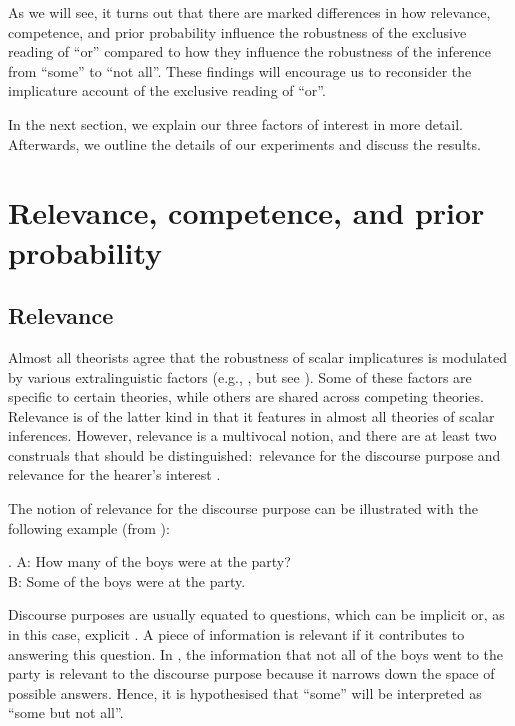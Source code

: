 \documentclass[12pt]{article}
\begin{document}
As we will see, it turns out that there are marked differences in how relevance, competence, and prior probability influence the robustness of the exclusive reading of ``or'' compared to how they influence the robustness of the inference from ``some'' to ``not all''. These findings will encourage us to reconsider the implicature account of the exclusive reading of ``or''.

In the next section, we explain our three factors of interest in more detail. Afterwards, we outline the details of our experiments and discuss the results.

\section{Relevance, competence, and prior probability}
\subsection*{Relevance}

Almost all theorists agree that the robustness of scalar implicatures is modulated by various extralinguistic factors (e.g., \citealt{chierchia2012, franke2009, geurts2010, horn1972}, but see \citealt{chierchia2004, levinson2000, storto2005}). Some of these factors are specific to certain theories, while others are shared across competing theories. Relevance is of the latter kind in that it features in almost all theories of scalar inferences. However, relevance is a multivocal notion, and there are at least two construals that should be distinguished:\ relevance for the discourse purpose and relevance for the hearer's interest \citep{geurts2010}.

The notion of relevance for the discourse purpose can be illustrated with the following example (from \citealt{kuppevelt1996}):

\ex.	A: How many of the boys were at the party? \\ B: Some of the boys were at the party.

Discourse purposes are usually equated to questions, which can be implicit or, as in this case, explicit \citep{roberts2012}. A piece of information is relevant if it contributes to answering this question. In \Last, the information that not all of the boys went to the party is relevant to the discourse purpose because it narrows down the space of possible answers. Hence, it is hypothesised that ``some'' will be interpreted as ``some but not all''. 
\end{document}
